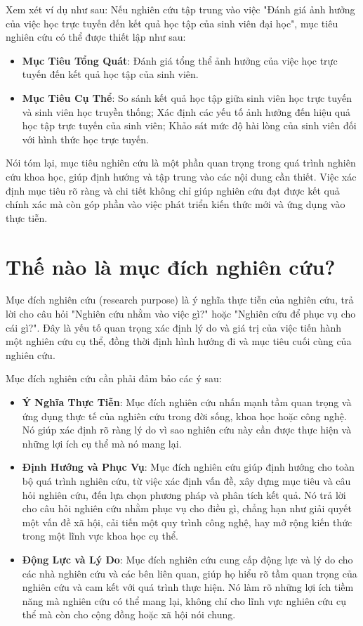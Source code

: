 Xem xét ví dụ như sau: Nếu nghiên cứu tập trung vào việc "Đánh giá ảnh hưởng của việc học trực tuyến đến kết quả học tập của sinh viên đại học", mục tiêu nghiên cứu có thể được thiết lập như sau:
\begin{itemize}
    \item \textbf{Mục Tiêu Tổng Quát}: Đánh giá tổng thể ảnh hưởng của việc học trực tuyến đến kết quả học tập của sinh viên.
    \item \textbf{Mục Tiêu Cụ Thể}: So sánh kết quả học tập giữa sinh viên học trực tuyến và sinh viên học truyền thống; Xác định các yếu tố ảnh hưởng đến hiệu quả học tập trực tuyến của sinh viên; Khảo sát mức độ hài lòng của sinh viên đối với hình thức học trực tuyến.
\end{itemize}

Nói tóm lại, mục tiêu nghiên cứu là một phần quan trọng trong quá trình nghiên cứu khoa học, giúp định hướng và tập trung vào các nội dung cần thiết. Việc xác định mục tiêu rõ ràng và chi tiết không chỉ giúp nghiên cứu đạt được kết quả chính xác mà còn góp phần vào việc phát triển kiến thức mới và ứng dụng vào thực tiễn.

\section{Thế nào là mục đích nghiên cứu?}


Mục đích nghiên cứu (research purpose) là ý nghĩa thực tiễn của nghiên cứu, trả lời cho câu hỏi "Nghiên cứu nhằm vào việc gì?" hoặc "Nghiên cứu để phục vụ cho cái gì?". Đây là yếu tố quan trọng xác định lý do và giá trị của việc tiến hành một nghiên cứu cụ thể, đồng thời định hình hướng đi và mục tiêu cuối cùng của nghiên cứu.

Mục đích nghiên cứu cần phải đảm bảo các ý sau:
\begin{itemize}
    \item \textbf{Ý Nghĩa Thực Tiễn}: Mục đích nghiên cứu nhấn mạnh tầm quan trọng và ứng dụng thực tế của nghiên cứu trong đời sống, khoa học hoặc công nghệ. Nó giúp xác định rõ ràng lý do vì sao nghiên cứu này cần được thực hiện và những lợi ích cụ thể mà nó mang lại.
    \item \textbf{Định Hướng và Phục Vụ}: Mục đích nghiên cứu giúp định hướng cho toàn bộ quá trình nghiên cứu, từ việc xác định vấn đề, xây dựng mục tiêu và câu hỏi nghiên cứu, đến lựa chọn phương pháp và phân tích kết quả. Nó trả lời cho câu hỏi nghiên cứu nhằm phục vụ cho điều gì, chẳng hạn như giải quyết một vấn đề xã hội, cải tiến một quy trình công nghệ, hay mở rộng kiến thức trong một lĩnh vực khoa học cụ thể.
    \item \textbf{Động Lực và Lý Do}: Mục đích nghiên cứu cung cấp động lực và lý do cho các nhà nghiên cứu và các bên liên quan, giúp họ hiểu rõ tầm quan trọng của nghiên cứu và cam kết với quá trình thực hiện. Nó làm rõ những lợi ích tiềm năng mà nghiên cứu có thể mang lại, không chỉ cho lĩnh vực nghiên cứu cụ thể mà còn cho cộng đồng hoặc xã hội nói chung.
\end{itemize}


